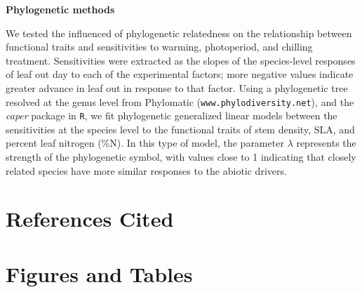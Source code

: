 \documentclass[11pt]{article}
\begin{document}

\textbf{Phylogenetic methods}

We tested the influenced of phylogenetic relatedness on the relationship between functional traits and sensitivities to warming, photoperiod, and chilling treatment. Sensitivities were extracted as the slopes of the species-level responses of leaf out day to each of the experimental factors; more negative values indicate greater advance in leaf out in response to that factor. Using a phylogenetic tree resolved at the genus level from Phylomatic (\texttt{www.phylodiversity.net}), and the \emph{caper} package in \texttt{R}, we fit phylogenetic generalized linear models between the sensitivities at the species level to the functional traits of stem density, SLA, and percent leaf nitrogen (\%N). In this type of model, the parameter $\lambda$ represents the strength of the phylogenetic symbol, with values close to 1 indicating that closely related species have more similar responses to the abiotic drivers.

\section*{References Cited}




\section*{Figures and Tables}

\end{document}
